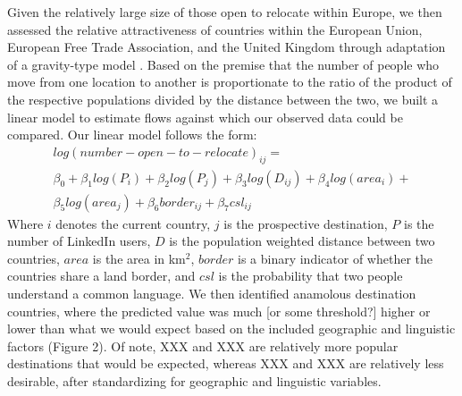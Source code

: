Given the relatively large size of those open to relocate within Europe, we then assessed the relative attractiveness of countries within the European Union, European Free Trade Association, and the United Kingdom through adaptation of a gravity-type model \cite{cohenInternationalMigrationGravity2008}. Based on the premise that the number of people who move from one location to another is proportionate to the ratio of the product of the respective populations divided by the distance between the two, we built a linear model to estimate flows against which our observed data could be compared. Our linear model follows the form:
\begin{multline*}
log(number-open-to-relocate)_{ij} = \\
\beta_{0} + \beta_{1}log(P_{i}) + \beta_{2}log(P_{j}) + \beta_{3}log(D_{ij}) + \beta_{4}log(area_{i}) + \\ \beta_{5}log(area_{j}) + \beta_{6}border_{ij} + \beta_{7}csl_{ij}
\end{multline*}
Where $i$ denotes the current country, $j$ is the prospective destination, $P$ is the number of LinkedIn users, $D$ is the population weighted distance between two countries, $area$ is the area in km$^2$, $border$ is a binary indicator of whether the countries share a land border, and $csl$ is the probability that two people understand a common language. We then identified anamolous destination countries, where the predicted value was much [or some threshold?] higher or lower than what we would expect based on the included geographic and linguistic factors (Figure 2). Of note, XXX and XXX are relatively more popular destinations that would be expected, whereas XXX and XXX are relatively less desirable, after standardizing for geographic and linguistic variables.
